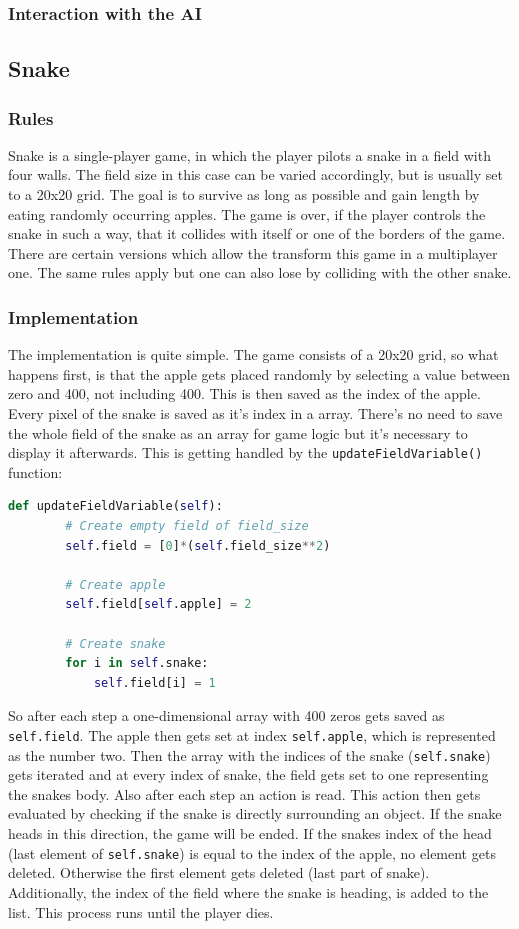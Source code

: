 \documentclass[12pt]{article}
\begin{document}
\subsubsection{Interaction with the AI}
\subsection{Snake}
\subsubsection{Rules}
Snake is a single-player game, in which the player pilots a snake in a field with four walls. The field size in this case can be varied accordingly, but is usually set to a 20x20 grid. The goal is to survive as long as possible and gain length by eating randomly occurring apples. The game is over, if the player controls the snake in such a way, that it collides with itself or one of the borders of the game. There are certain versions which allow the transform this game in a multiplayer one. The same rules apply but one can also lose by colliding with the other snake.
\subsubsection{Implementation}
The implementation is quite simple. The game consists of a 20x20 grid, so what happens first, is that the apple gets placed randomly by selecting a value between zero and 400, not including 400. This is then saved as the index of the apple. Every pixel of the snake is saved as it's index in a array. There's no need to save the whole field of the snake as an array for game logic but it's necessary to display it afterwards. This is getting handled by the \lstinline{updateFieldVariable()} function:
\begin{lstlisting}[language=Python, caption=Example - Create a snake field every second of size \lstinline{self.field_size}]
    def updateFieldVariable(self):
        # Create empty field of field_size
        self.field = [0]*(self.field_size**2)

        # Create apple
        self.field[self.apple] = 2
        
        # Create snake
        for i in self.snake:
            self.field[i] = 1
\end{lstlisting}
So after each step a one-dimensional array with 400 zeros gets saved as \lstinline{self.field}. The apple then gets set at index \lstinline{self.apple}, which is represented as the number two. Then the array with the indices of the snake (\lstinline{self.snake}) gets iterated and at every index of snake, the field gets set to one representing the snakes body. Also after each step an action is read. This action then gets evaluated by checking if the snake is directly surrounding an object. If the snake heads in this direction, the game will be ended. If the snakes index of the head (last element of \lstinline{self.snake}) is equal to the index of the apple, no element gets deleted. Otherwise the first element gets deleted (last part of snake). Additionally, the index of the field where the snake is heading, is added to the list. This process runs until the player dies.
\end{document}
